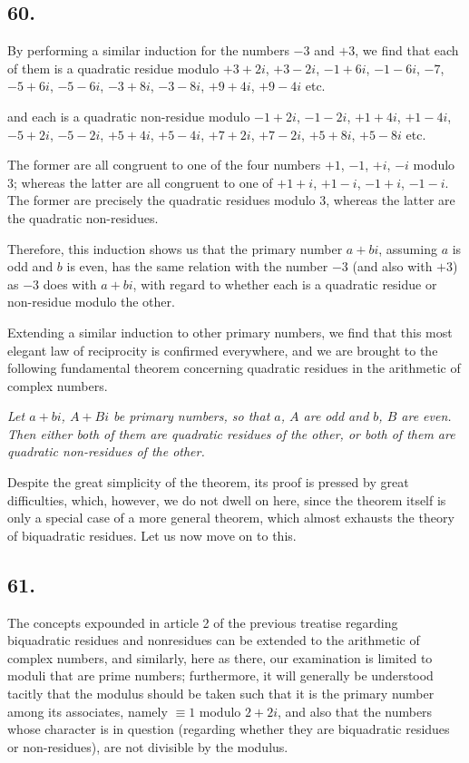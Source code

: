 \documentclass[twoside,12pt]{memoir}
\begin{document}
\subsection*{60.}

By performing a similar induction for the numbers \(-3\) and \(+3\), we find that each of them is a quadratic residue modulo \(+3+2 i\), \(+3-2 i\), \pagebreak%
\(-1+6 i\), \(-1-6 i\), \(-7\), \(-5+6 i\), \(-5-6 i\), \(-3+8 i\), \(-3-8 i\), \(+9+4 i\), \(+9-4 i\) etc{.}

and each is a quadratic non-residue modulo \(-1+2 i\), \(-1-2 i\), \(+1+4 i\), \(+1-4 i\), \(-5+2 i\), \(-5-2 i\), \(+5+4 i\), \(+5-4 i\), \(+7+2 i\), \(+7-2 i\), \(+5+8 i\), \(+5-8 i\) etc{.}

The former are all congruent to one of the four numbers \(+1\), \(-1\), \(+i\), \(-i\) modulo \(3\); whereas the latter are all congruent to one of \(+1+i\), \(+1-i\), \(-1+i\), \(-1-i\). The former are precisely the quadratic residues modulo \(3\), whereas the latter are the quadratic non-residues.

Therefore, this induction shows us that the primary number \(a+b i\), assuming \(a\) is odd and \(b\) is even, has the same relation with the number \(-3\) (and also with \(+3\)) as \(-3\) does with \(a+bi\), with regard to whether each is a quadratic residue or non-residue modulo the other.

Extending a similar induction to other primary numbers, we find that this most elegant law of reciprocity is confirmed everywhere, and we are brought to the following fundamental theorem concerning quadratic residues in the arithmetic of complex numbers. 
 
\textit{Let \(a+b i\), \(A+B i\) be primary numbers, so that \(a\), \(A\) are odd and \(b\), \(B\) are even.  Then either both of them are quadratic residues of the other, or both of them are quadratic non-residues of the other.} 
 
Despite the great simplicity of the theorem, its proof is pressed by great difficulties, which, however, we do not dwell on here, since the theorem itself is only a special case of a more general theorem, which almost exhausts the theory of biquadratic residues. Let us now move on to this.

\subsection*{61.}

The concepts expounded in article 2 of the previous treatise regarding biquadratic residues and nonresidues can be extended to the arithmetic of complex numbers, and similarly, here as there, our examination is limited to moduli that are prime numbers; furthermore, it will generally be understood tacitly that the modulus should be taken such that it is the primary number among its associates, namely \(\equiv 1\) modulo \(2+2i\), and also that the numbers whose character is in question (regarding whether they are biquadratic residues or non-residues), are not divisible by the modulus.
\end{document}

